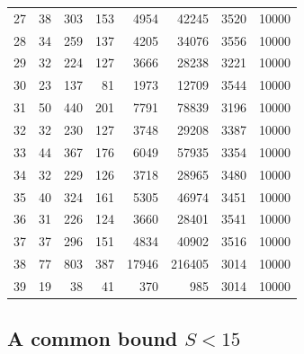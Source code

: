 \documentclass[12pt]{article}
\numberwithin{equation}{section}
\begin{document}
\begin{longtable}{r|rrrrr|r|r}
27&38&303&153&4954&42245&3520&10000\\
28&34&259&137&4205&34076&3556&10000\\
29&32&224&127&3666&28238&3221&10000\\
30&23&137&81&1973&12709&3544&10000\\
31&50&440&201&7791&78839&3196&10000\\
32&32&230&127&3748&29208&3387&10000\\
33&44&367&176&6049&57935&3354&10000\\
34&32&229&126&3718&28965&3480&10000\\
35&40&324&161&5305&46974&3451&10000\\
36&31&226&124&3660&28401&3541&10000\\
37&37&296&151&4834&40902&3516&10000\\
38&77&803&387&17946&216405&3014&10000\\
39&19&38&41&370&985&3014&10000\\
\end{longtable}
\endgroup


\subsection{A common bound \texorpdfstring{$S<15$}{S<15}}
\end{document}
